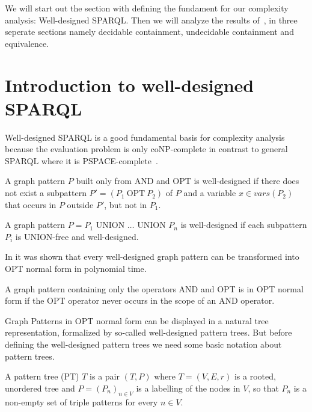 We will start out the section with defining the fundament for our complexity
analysis: Well-designed SPARQL. Then we will analyze the results of~\cite{pichler2014containment}, in three seperate
sections namely decidable containment, undecidable containment and equivalence.

\section{Introduction to well-designed SPARQL}
Well-designed SPARQL is a good fundamental basis for complexity analysis because
the evaluation problem is only coNP-complete in contrast to general SPARQL where
it is PSPACE-complete~\cite{perez2009semantics}.

\begin{definition}
	A graph pattern $P$ built only from AND and OPT is well-designed if there does
	not exist a subpattern $P' = (P_1 \  \mbox{OPT} \ P_2)$ of $P$ and a
	variable $x \in	vars(P_2)$ that occurs in $P$ outside $P'$, but not in $P_1$. 
	
	A graph pattern $P = P_1 \mbox{ UNION } \dots \mbox{ UNION } P_n$ is
	well-designed if each subpattern $P_i$ is UNION-free and well-designed.
\end{definition}

In \cite{letelier2013static} it was shown that every well-designed graph pattern
can be transformed into OPT normal form in polynomial time. 
\begin{definition}
	A graph pattern containing only the operators AND and OPT is in OPT normal form
	if the OPT operator never occurs in the scope of an AND operator. 
\end{definition}

Graph Patterns in OPT normal form can be displayed in a natural tree representation, 
formalized by so-called well-designed pattern trees. But before defining the
well-designed pattern trees we need some basic notation about pattern trees.

\begin{definition}\label{def:pt}
	A pattern tree (PT) $T$ is a pair $(T,P)$ where  $T= (V,E,r)$ is a rooted,
	unordered tree and $P = (P_n)_{n \in V}$ is a labelling of the nodes in $V$,
	so that $P_n$ is a non-empty set of triple patterns for every $n \in V$.  
\end{definition}

